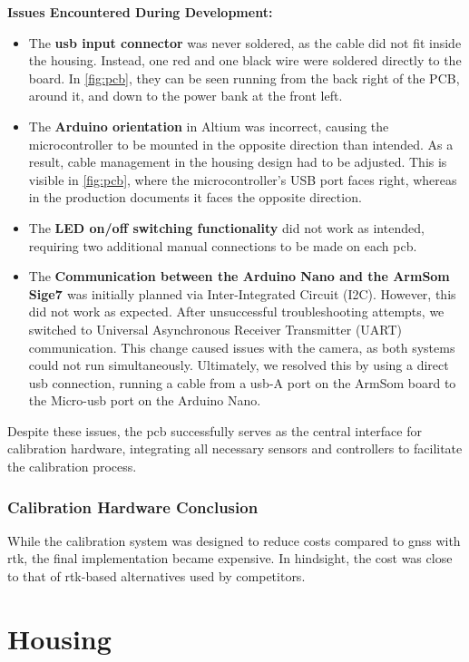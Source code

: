 \textbf{Issues Encountered During Development:}
\begin{itemize}
	\item The \textbf{\acrshort{usb} input connector} was never soldered, as the cable did not fit inside the housing. Instead, one red and one black wire were soldered directly to the board. In \autoref{fig:pcb}, they can be seen running from the back right of the PCB, around it, and down to the power bank at the front left.
	\item The \textbf{Arduino orientation} in Altium was incorrect, causing the microcontroller to be mounted in the opposite direction than intended. As a result, cable management in the housing design had to be adjusted. This is visible in \autoref{fig:pcb}, where the microcontroller’s USB port faces right, whereas in the production documents it faces the opposite direction.
	\item The \textbf{LED on/off switching functionality} did not work as intended, requiring two additional manual connections to be made on each \acrshort{pcb}.
	\item The \textbf{Communication between the Arduino Nano \cite{arduino_nano_dfrobot} and the ArmSom Sige7 \cite{armsom_sige7}} was initially planned via Inter-Integrated Circuit (I2C). However, this did not work as expected. After unsuccessful troubleshooting attempts, we switched to Universal Asynchronous Receiver Transmitter (UART) communication. This change caused issues with the camera, as both systems could not run simultaneously. Ultimately, we resolved this by using a direct \acrshort{usb} connection, running a cable from a \acrshort{usb}-A port on the ArmSom board to the Micro-\acrshort{usb} port on the Arduino Nano.
\end{itemize}

Despite these issues, the \acrshort{pcb} successfully serves as the central interface for calibration hardware, integrating all necessary sensors and controllers to facilitate the calibration process.

\subsubsection*{Calibration Hardware Conclusion}
While the calibration system was designed to reduce costs compared to \acrshort{gnss} with \acrshort{rtk}, the final implementation became expensive. In hindsight, the cost was close to that of \acrshort{rtk}-based alternatives used by competitors.

\section{Housing}
